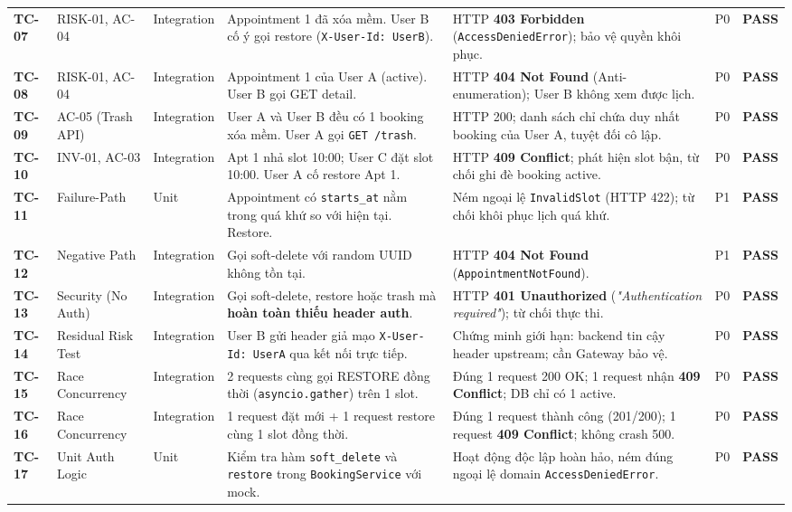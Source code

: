 \documentclass[10pt,a4paper]{article}
\begin{document}
\begin{tabularx}{\linewidth}{@{}P{0.8cm}P{1.8cm}P{1.2cm}P{3.8cm}P{3.5cm}P{0.8cm}Y@{}}
\textbf{TC-07} & RISK-01, AC-04 & Integration & Appointment 1 đã xóa mềm. User B cố ý gọi restore (\texttt{X-User-Id: UserB}). & HTTP \textbf{403 Forbidden} (\texttt{AccessDeniedError}); bảo vệ quyền khôi phục. & P0 & \textcolor{passgreen}{\textbf{PASS}} \\
\textbf{TC-08} & RISK-01, AC-04 & Integration & Appointment 1 của User A (active). User B gọi GET detail. & HTTP \textbf{404 Not Found} (Anti-enumeration); User B không xem được lịch. & P0 & \textcolor{passgreen}{\textbf{PASS}} \\
\textbf{TC-09} & AC-05 (Trash API) & Integration & User A và User B đều có 1 booking xóa mềm. User A gọi \texttt{GET /trash}. & HTTP 200; danh sách chỉ chứa duy nhất booking của User A, tuyệt đối cô lập. & P0 & \textcolor{passgreen}{\textbf{PASS}} \\
\textbf{TC-10} & INV-01, AC-03 & Integration & Apt 1 nhả slot 10:00; User C đặt slot 10:00. User A cố restore Apt 1. & HTTP \textbf{409 Conflict}; phát hiện slot bận, từ chối ghi đè booking active. & P0 & \textcolor{passgreen}{\textbf{PASS}} \\
\textbf{TC-11} & Failure-Path & Unit & Appointment có \texttt{starts\_at} nằm trong quá khứ so với hiện tại. Restore. & Ném ngoại lệ \texttt{InvalidSlot} (HTTP 422); từ chối khôi phục lịch quá khứ. & P1 & \textcolor{passgreen}{\textbf{PASS}} \\
\textbf{TC-12} & Negative Path & Integration & Gọi soft-delete với random UUID không tồn tại. & HTTP \textbf{404 Not Found} (\texttt{AppointmentNotFound}). & P1 & \textcolor{passgreen}{\textbf{PASS}} \\
\textbf{TC-13} & Security (No Auth) & Integration & Gọi soft-delete, restore hoặc trash mà \textbf{hoàn toàn thiếu header auth}. & HTTP \textbf{401 Unauthorized} (\textit{"Authentication required"}); từ chối thực thi. & P0 & \textcolor{passgreen}{\textbf{PASS}} \\
\textbf{TC-14} & Residual Risk Test & Integration & User B gửi header giả mạo \texttt{X-User-Id: UserA} qua kết nối trực tiếp. & Chứng minh giới hạn: backend tin cậy header upstream; cần Gateway bảo vệ. & P0 & \textcolor{passgreen}{\textbf{PASS}} \\
\textbf{TC-15} & Race Concurrency & Integration & 2 requests cùng gọi RESTORE đồng thời (\texttt{asyncio.gather}) trên 1 slot. & Đúng 1 request 200 OK; 1 request nhận \textbf{409 Conflict}; DB chỉ có 1 active. & P0 & \textcolor{passgreen}{\textbf{PASS}} \\
\textbf{TC-16} & Race Concurrency & Integration & 1 request đặt mới + 1 request restore cùng 1 slot đồng thời. & Đúng 1 request thành công (201/200); 1 request \textbf{409 Conflict}; không crash 500. & P0 & \textcolor{passgreen}{\textbf{PASS}} \\
\textbf{TC-17} & Unit Auth Logic & Unit & Kiểm tra hàm \texttt{soft\_delete} và \texttt{restore} trong \texttt{BookingService} với mock. & Hoạt động độc lập hoàn hảo, ném đúng ngoại lệ domain \texttt{AccessDeniedError}. & P0 & \textcolor{passgreen}{\textbf{PASS}} \\
\bottomrule
\end{tabularx}
\end{document}
